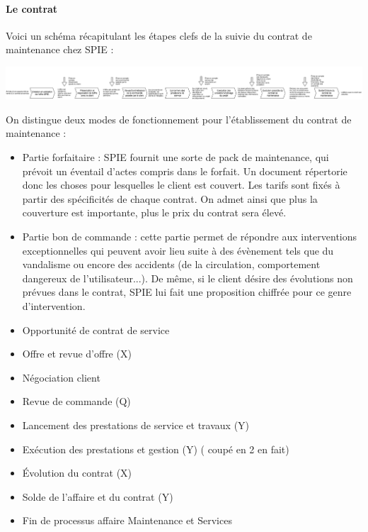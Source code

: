 \paragraph{Le contrat}
Voici un schéma récapitulant les étapes clefs de la suivie du contrat de maintenance chez SPIE :

\begin {center}
\includegraphics[width=\textwidth]{png/SimplificationProcessusDeMaintenanceSPIE.png}
\end {center}

On distingue deux modes de fonctionnement pour l’établissement du contrat de maintenance :

\begin{itemize}
\item Partie forfaitaire : SPIE fournit une sorte de pack de maintenance, qui prévoit un éventail d’actes compris dans le forfait. Un document répertorie donc les choses pour lesquelles le client est couvert. Les tarifs sont fixés à partir des spécificités de chaque contrat. On admet ainsi que plus la couverture est importante, plus le prix du contrat sera élevé. 
\item Partie bon de commande : cette partie permet de répondre aux interventions exceptionnelles qui peuvent avoir lieu suite à des évènement tels que du vandalisme ou encore des accidents (de la circulation, comportement dangereux de l’utilisateur...). De même, si le client désire des évolutions non prévues dans le contrat, SPIE lui fait une proposition chiffrée pour ce genre d’intervention.
\end{itemize}


\begin{itemize}
\item Opportunité de contrat de service
\item Offre et revue d’offre (X)
\item Négociation client 
\item Revue de commande (Q)
\item Lancement des prestations de service et travaux (Y)
\item Exécution des prestations et gestion (Y) ( coupé en 2 en fait)
\item Évolution du contrat (X)
\item Solde de l’affaire et du contrat (Y)
\item Fin de processus affaire Maintenance et Services
\end{itemize}

